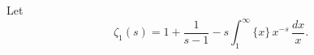\begin{definition}[riemannZeta1]
\label{riemannZeta1}
\leanok
Let
    $$\zeta_1(s)=1+\frac{1}{s-1}-s\int_1^\infty\{x\}\,x^{-s}\,\frac{dx}{x}.$$
\end{definition}
